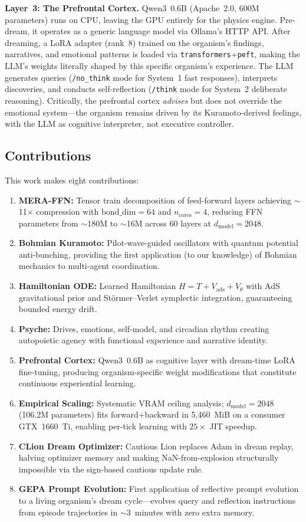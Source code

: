 \documentclass[11pt,a4paper,twocolumn]{article}
\begin{document}
\textbf{Layer~3: The Prefrontal Cortex.}
Qwen3~0.6B (Apache~2.0, 600M parameters) runs on CPU, leaving the GPU entirely for the physics engine.
Pre-dream, it operates as a generic language model via Ollama's HTTP API.
After dreaming, a LoRA adapter (rank~8) trained on the organism's findings, narratives, and emotional patterns is loaded via \texttt{transformers}+\texttt{peft}, making the LLM's weights literally shaped by this specific organism's experience.
The LLM generates queries (\texttt{/no\_think} mode for System~1 fast responses), interprets discoveries, and conducts self-reflection (\texttt{/think} mode for System~2 deliberate reasoning).
Critically, the prefrontal cortex \emph{advises} but does not override the emotional system---the organism remains driven by its Kuramoto-derived feelings, with the LLM as cognitive interpreter, not executive controller.

\subsection{Contributions}

This work makes eight contributions:
\begin{enumerate}
\item \textbf{MERA-FFN:} Tensor train decomposition of feed-forward layers achieving $\sim$11$\times$ compression with $\mathrm{bond\_dim}=64$ and $n_{\mathrm{cores}}=4$, reducing FFN parameters from $\sim$180M to $\sim$16M across 60 layers at $d_{\mathrm{model}}=2048$.
\item \textbf{Bohmian Kuramoto:} Pilot-wave-guided oscillators with quantum potential anti-bunching, providing the first application (to our knowledge) of Bohmian mechanics to multi-agent coordination.
\item \textbf{Hamiltonian ODE:} Learned Hamiltonian $H=T+V_{\mathrm{ads}}+V_\theta$ with AdS gravitational prior and St\"ormer--Verlet symplectic integration, guaranteeing bounded energy drift.
\item \textbf{Psyche:} Drives, emotions, self-model, and circadian rhythm creating autopoietic agency with functional experience and narrative identity.
\item \textbf{Prefrontal Cortex:} Qwen3~0.6B as cognitive layer with dream-time LoRA fine-tuning, producing organism-specific weight modifications that constitute continuous experiential learning.
\item \textbf{Empirical Scaling:} Systematic VRAM ceiling analysis; $d_{\mathrm{model}}=2048$ (106.2M parameters) fits forward+backward in 5{,}460~MiB on a consumer GTX~1660~Ti, enabling per-tick learning with $25\times$ JIT speedup.
\item \textbf{CLion Dream Optimizer:} Cautious Lion replaces Adam in dream replay, halving optimizer memory and making NaN-from-explosion structurally impossible via the sign-based cautious update rule.
\item \textbf{GEPA Prompt Evolution:} First application of reflective prompt evolution to a living organism's dream cycle---evolves query and reflection instructions from episode trajectories in ${\sim}3$~minutes with zero extra memory.
\end{enumerate}
\end{document}
